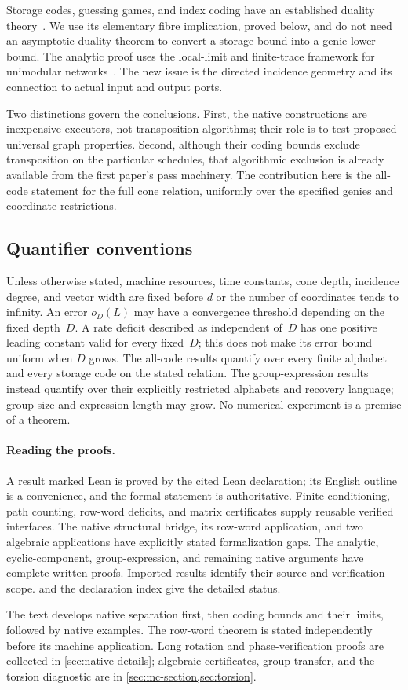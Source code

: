 Storage codes, guessing games, and index coding have an established duality theory~\cite{Mazumdar,ArbabjolfaeiKim}. We use its elementary fibre implication, proved below, and do not need an asymptotic duality theorem to convert a storage bound into a genie lower bound. The analytic proof uses the local-limit and finite-trace framework for unimodular networks~\cite{AldousLyons}. The new issue is the directed incidence geometry and its connection to actual input and output ports.

Two distinctions govern the conclusions. First, the native constructions are inexpensive executors, not transposition algorithms; their role is to test proposed universal graph properties. Second, although their coding bounds exclude transposition on the particular schedules, that algorithmic exclusion is already available from the first paper's pass machinery. The contribution here is the all-code statement for the full cone relation, uniformly over the specified genies and coordinate restrictions.

\subsection{Quantifier conventions}
Unless otherwise stated, machine resources, time constants, cone depth, incidence degree, and vector width are fixed before $d$ or the number of coordinates tends to infinity. An error $o_D(L)$ may have a convergence threshold depending on the fixed depth~$D$. A rate deficit described as independent of~$D$ has one positive leading constant valid for every fixed~$D$; this does not make its error bound uniform when $D$ grows. The all-code results quantify over every finite alphabet and every storage code on the stated relation. The group-expression results instead quantify over their explicitly restricted alphabets and recovery language; group size and expression length may grow. No numerical experiment is a premise of a theorem.

\paragraph{Reading the proofs.} A result marked \textsf{Lean} is proved by the cited Lean declaration; its English outline is a convenience, and the formal statement is authoritative. Finite conditioning, path counting, row-word deficits, and matrix certificates supply reusable verified interfaces. The native structural bridge, its row-word application, and two algebraic applications have explicitly stated formalization gaps. The analytic, cyclic-component, group-expression, and remaining native arguments have complete written proofs. Imported results identify their source and verification scope.  and the declaration index give the detailed status.

The text develops native separation first, then coding bounds and their limits, followed by native examples. The row-word theorem is stated independently before its machine application. Long rotation and phase-verification proofs are collected in \cref{sec:native-details}; algebraic certificates, group transfer, and the torsion diagnostic are in \cref{sec:mc-section,sec:torsion}.

